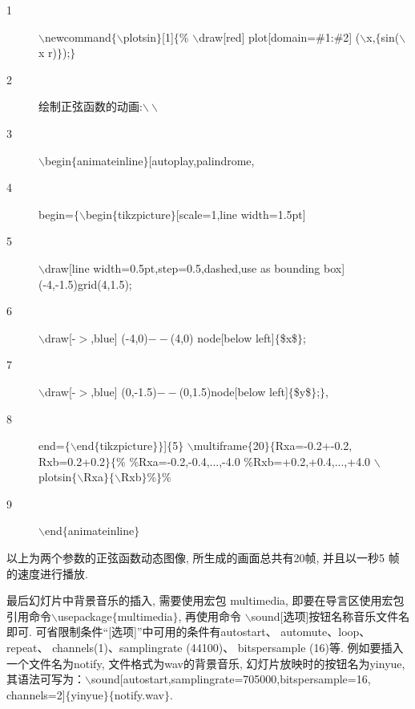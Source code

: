 \begin{description}
   \item[1]$\backslash$newcommand$\{\backslash$plotsin$\}$[1]$\{$\%
	   $\backslash$draw[red] plot[domain=\#1:\#2]
	 ($\backslash$x,$\{$sin($\backslash$x r)$\}$);$\}$
   \item[2] 绘制正弦函数的动画:$\backslash\backslash$
   \item[3]$\backslash$begin$\{$animateinline$\}$[autoplay,palindrome,
   \item[4]  begin=$\{\backslash$begin$\{$tikzpicture$\}$[scale=1,line width=1.5pt]
   \item[5]$\backslash$draw[line width=0.5pt,step=0.5,dashed,use as bounding box] (-4,-1.5)grid(4,1.5);
   \item[6]$\backslash$draw[-$>$,blue] (-4,0)$--$(4,0) node[below left]$\{$\$x\$$\}$;
   \item[7]$\backslash$draw[-$>$,blue] (0,-1.5)$--$(0,1.5)node[below left]$\{$\$y\$$\}$;$\}$,
   \item[8] end=$\{\backslash$end$\{$tikzpicture$\}\}$]$\{$5$\}$
           $\backslash$multiframe$\{$20$\}\{$Rxa=-0.2+-0.2, Rxb=0.2+0.2$\}\{$\%
        \%Rxa=-0.2,-0.4,...,-4.0
        \%Rxb=+0.2,+0.4,...,+4.0
        $\backslash$plotsin$\{\backslash$Rxa$\}\{\backslash$Rxb$\}$\%$\}$\%
   \item[9]$\backslash$end$\{$animateinline$\}$
 \end{description}

\noindent 以上为两个参数的正弦函数动态图像, 所生成的画面总共有20帧, 并且以一秒5 帧的速度进行播放.


最后幻灯片中背景音乐的插入, 需要使用宏包 multimedia, 即要在导言区使用宏包引用命令$\backslash$usepackage$\{$multimedia$\}$, 再使用命令
$\backslash$sound[选项]{按钮名称}{音乐文件名}即可. 可省限制条件“[选项]”中可用的条件有autostart、 automute、loop、repeat、
channels(1)、samplingrate (44100)、 bitspersample (16)等.
例如要插入一个文件名为notify, 文件格式为wav的背景音乐, 幻灯片放映时的按钮名为yinyue, 其语法可写为：$\backslash$sound[autostart,samp\-lingrate=705000,bitspersample=16,
channels=2]$\{$yinyue$\}\{$notify.wav$\}$.

